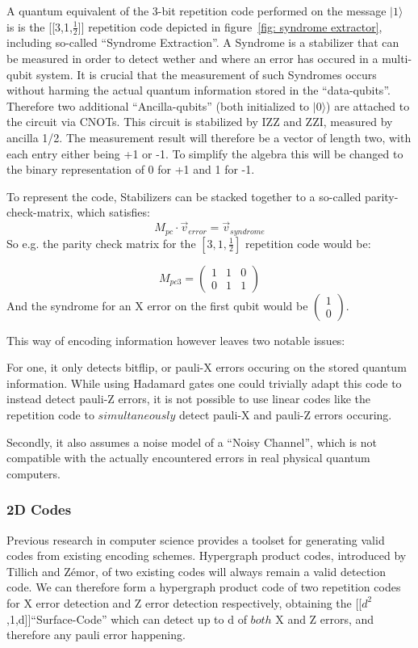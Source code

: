 A quantum equivalent of the 3-bit repetition code performed on
the message $|1\rangle$ is is the [[3,1,$\frac{1}{2}$]] repetition
code depicted in 
figure~\ref{fig: syndrome extractor}, including so-called
``Syndrome Extraction''. A Syndrome is a stabilizer that can be
measured in order to detect wether and where an error has occured
in a multi-qubit system. It is crucial that the 
measurement of such Syndromes occurs without harming the actual
quantum information stored in the ``data-qubits''. Therefore
two additional ``Ancilla-qubits'' (both initialized to 
$|0\rangle$) are attached to the circuit via CNOTs.
This circuit is stabilized by IZZ and ZZI, measured by ancilla 
1/2. The measurement result will therefore be a vector of length
two, with each entry either being +1 or -1. To simplify the 
algebra this will be changed to the binary representation of 0 
for +1 and 1 for -1. 

To represent the code, Stabilizers can be stacked together to
a so-called parity-check-matrix, which satisfies:
\begin{equation}
	M_{pc}\cdot \vec{v}_{error} = \vec{v}_{syndrome}
\end{equation}
So e.g. the parity check matrix for the $[3,1,\frac{1}{2}]$
repetition code would be:

\begin{equation}
	M_{pc3} = \left( 
	\begin{array}{ccc}
		1 & 1 & 0 \\
		0 & 1 & 1
	\end{array}
	\right)
\end{equation}
And the syndrome for an X error on the first qubit would be
$\left(\begin{array}{c}1\\0\end{array}\right)$.

This way of encoding information however leaves two notable
issues:

For one, it only detects bitflip, or pauli-X errors occuring on
the stored quantum information. While using Hadamard gates one
could trivially adapt this code to instead detect pauli-Z errors,
it is not possible to use linear codes like the repetition code
to $simultaneously$ detect pauli-X and pauli-Z errors occuring.

Secondly, it also assumes a noise model of a ``Noisy Channel'',
which is not compatible with the actually encountered errors in
real physical quantum computers.
\newpage
\subsubsection{2D Codes}
Previous research in computer science 
provides a toolset for generating valid codes
from existing encoding schemes. 
Hypergraph product codes, introduced by Tillich and Z\'emor,
of two 
existing codes will always remain a valid detection code.
We can therefore form a hypergraph product code of two repetition
codes for X error detection and Z error detection respectively,
obtaining the [[$d^2$,1,d]]``Surface-Code'' which can detect up
to d of $both$ X and Z errors, and 
therefore any pauli error happening.

